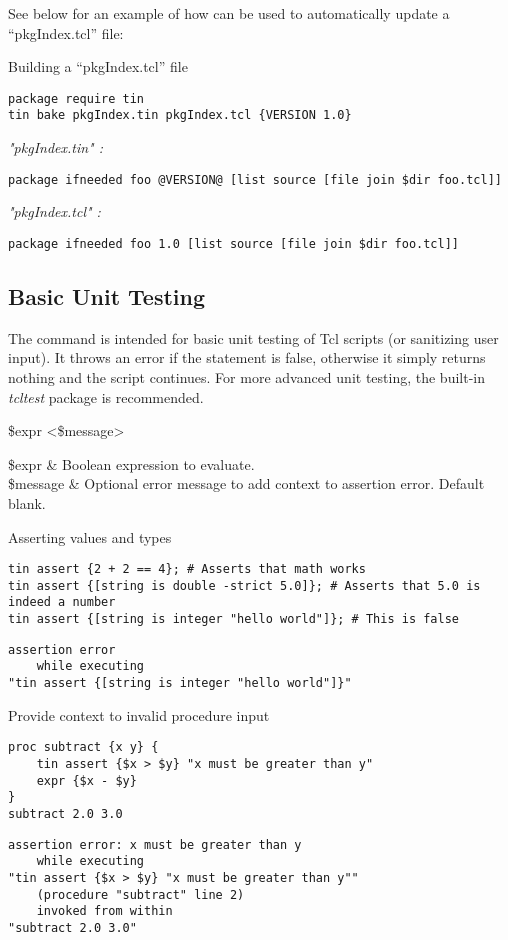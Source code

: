 \documentclass{article}
\begin{document}
See below for an example of how  can be used to automatically update a ``pkgIndex.tcl'' file:

\begin{example}{Building a ``pkgIndex.tcl'' file}
\begin{lstlisting}
package require tin
tin bake pkgIndex.tin pkgIndex.tcl {VERSION 1.0}
\end{lstlisting}
\tcblower

\textit{"pkgIndex.tin" :}
\begin{lstlisting}
package ifneeded foo @VERSION@ [list source [file join $dir foo.tcl]]
\end{lstlisting}
\textit{"pkgIndex.tcl" :}
\begin{lstlisting}
package ifneeded foo 1.0 [list source [file join $dir foo.tcl]]
\end{lstlisting}
\end{example}
\clearpage
\subsection{Basic Unit Testing}
The command  is intended for basic unit testing of Tcl scripts (or sanitizing user input).
It throws an error if the statement is false, otherwise it simply returns nothing and the script continues.
For more advanced unit testing, the built-in \textit{tcltest} package is recommended.
\begin{syntax}
 \$expr <\$message>
\end{syntax}
\begin{args}
\$expr & Boolean expression to evaluate. \\
\$message & Optional error message to add context to assertion error. Default blank.
\end{args}
\begin{example}{Asserting values and types}
\begin{lstlisting}
tin assert {2 + 2 == 4}; # Asserts that math works
tin assert {[string is double -strict 5.0]}; # Asserts that 5.0 is indeed a number
tin assert {[string is integer "hello world"]}; # This is false
\end{lstlisting} 
\tcblower
\begin{lstlisting}
assertion error
    while executing
"tin assert {[string is integer "hello world"]}"
\end{lstlisting}
\end{example}

\begin{example}{Provide context to invalid procedure input}
\begin{lstlisting}
proc subtract {x y} {
    tin assert {$x > $y} "x must be greater than y"
    expr {$x - $y}
}
subtract 2.0 3.0
\end{lstlisting}
\tcblower
\begin{lstlisting}
assertion error: x must be greater than y
    while executing
"tin assert {$x > $y} "x must be greater than y""
    (procedure "subtract" line 2)
    invoked from within
"subtract 2.0 3.0"
\end{lstlisting}
\end{example}
\end{document}
